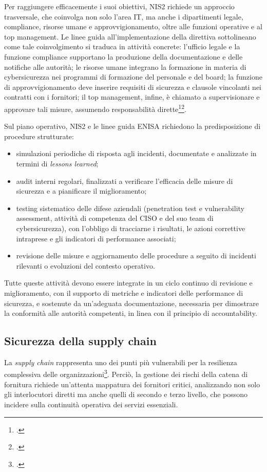 Per raggiungere efficacemente i suoi obiettivi, NIS2 richiede un approccio trasversale, 
che coinvolga non solo l’area IT, ma anche i dipartimenti legale, compliance, risorse umane 
e approvvigionamento, oltre alle funzioni operative e al top management.
Le linee guida all'implementazione della direttiva sottolineano come tale coinvolgimento si traduca in attività concrete:
l’ufficio legale e la funzione compliance supportano la produzione della documentazione e 
delle notifiche alle autorità; le risorse umane integrano la 
formazione in materia di cybersicurezza nei programmi di formazione del personale e del board; 
la funzione di approvvigionamento deve inserire requisiti di sicurezza e clausole vincolanti 
nei contratti con i fornitori; il top management, infine, è chiamato a supervisionare e approvare 
tali misure, assumendo responsabilità dirette\footcite{ecso-whitepaper-nis2}\footcite{enisa-implementing-guidance}.

Sul piano operativo, NIS2 e le linee guida ENISA richiedono la predisposizione di procedure strutturate:  
\begin{itemize}
    \item simulazioni periodiche di risposta agli incidenti, documentate e analizzate in termini di \textit{lessons learned};  
    \item audit interni regolari, finalizzati a verificare l’efficacia delle misure di sicurezza e a pianificare il miglioramento; 
    \item testing sistematico delle difese aziendali (penetration test e vulnerability assessment, attività di competenza del CISO e del suo team di cybersicurezza), 
    con l'obbligo di tracciarne i risultati, le azioni correttive intraprese e gli indicatori di performance associati; 
    \item revisione delle misure e aggiornamento delle procedure a seguito di incidenti rilevanti o 
    evoluzioni del contesto operativo.
\end{itemize}

Tutte queste attività devono essere integrate in un ciclo continuo di revisione e miglioramento, 
con il supporto di metriche e indicatori delle performance di sicurezza, e sostenute da un’adeguata documentazione, 
necessaria per dimostrare la conformità alle autorità competenti, in linea con il principio di accountability.


\subsection{Sicurezza della supply chain}
La \textit{supply chain} rappresenta uno dei punti più vulnerabili per la resilienza complessiva 
delle organizzazioni\footcite[pp. 22--25]{ecso-whitepaper-nis2}. 
Perciò, la gestione dei rischi della catena di fornitura richiede un'attenta
mappatura dei fornitori critici, analizzando non solo gli interlocutori diretti ma anche quelli 
di secondo e terzo livello, che possono incidere sulla continuità operativa dei servizi essenziali. 

